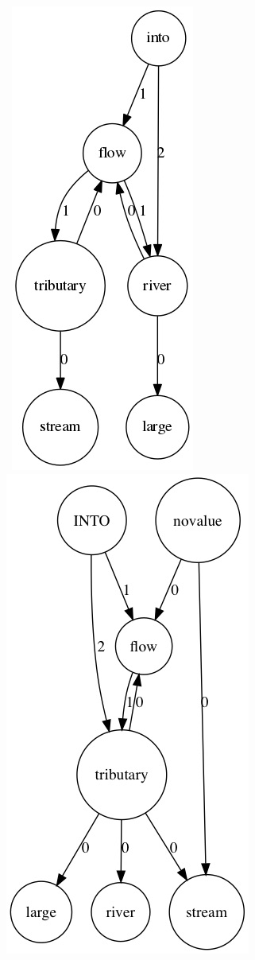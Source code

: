 \documentclass[twoside,b5paper,10pt]{article}
\begin{document}
\begin{figure}[htb]
  \vspace{3pt}
  \centerline{
  \hbox{
  \hspace{0.0in}
        \includegraphics[scale=0.5]{Figure/tributary.jpg}
        \hspace{0.1\columnwidth}
        \includegraphics[scale=0.5]{Figure/tributarynew.jpg}
}}
\end{figure}
\end{document}
